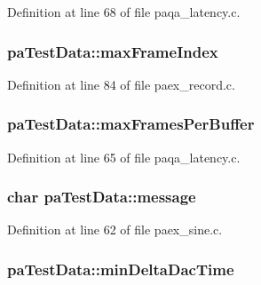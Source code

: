 Definition at line 68 of file paqa\+\_\+latency.\+c.

\subsubsection[{\texorpdfstring{max\+Frame\+Index}{maxFrameIndex}}]{ pa\+Test\+Data\+::max\+Frame\+Index}\hypertarget{structpa_test_data_af927cb4284f8d465356704d60690fba5}{}\label{structpa_test_data_af927cb4284f8d465356704d60690fba5}


Definition at line 84 of file paex\+\_\+record.\+c.

\subsubsection[{\texorpdfstring{max\+Frames\+Per\+Buffer}{maxFramesPerBuffer}}]{ pa\+Test\+Data\+::max\+Frames\+Per\+Buffer}\hypertarget{structpa_test_data_aae99bce428d398f6650c2436b2f76c7d}{}\label{structpa_test_data_aae99bce428d398f6650c2436b2f76c7d}


Definition at line 65 of file paqa\+\_\+latency.\+c.

\subsubsection[{\texorpdfstring{message}{message}}]{\setlength{\rightskip}{0pt plus 5cm}char pa\+Test\+Data\+::message}\hypertarget{structpa_test_data_a0c8c82b8b21edd1554fbcc2677ad2140}{}\label{structpa_test_data_a0c8c82b8b21edd1554fbcc2677ad2140}


Definition at line 62 of file paex\+\_\+sine.\+c.

\subsubsection[{\texorpdfstring{min\+Delta\+Dac\+Time}{minDeltaDacTime}}]{ pa\+Test\+Data\+::min\+Delta\+Dac\+Time}\hypertarget{structpa_test_data_af8e0869352206e07bd4003ad47e0434c}{}\label{structpa_test_data_af8e0869352206e07bd4003ad47e0434c}


